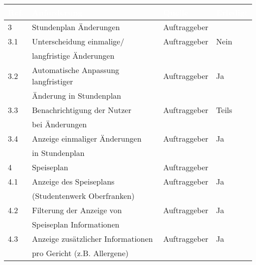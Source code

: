 \begin{table}[H]
\begin{center}
  \begin{tabular}{| l | l | l | l |}
  
\hline
\rowcolor{Gray}
\textcolor{white}{\textbf{Ref.}} & \textcolor{white}{\textbf{Anforderung}} & \textcolor{white}{\textbf{Quelle}} & \textcolor{white}{\textbf{Erledigt}} \\

\hline    
\rowcolor{LGray} 						
3		& Stundenplan Änderungen								& Auftraggeber & \\
\hline
3.1		& Unterscheidung einmalige/ 							& Auftraggeber & Nein\\
		& langfristige Änderungen								&			   &\\
\hline
3.2		& Automatische Anpassung langfristiger 			 		& Auftraggeber & Ja\\
		& Änderung in Stundenplan								& 			   &\\
\hline
3.3		& Benachrichtigung der Nutzer 							& Auftraggeber & Teils\\
		& bei Änderungen										& 			   &\\
\hline
3.4		& Anzeige einmaliger Änderungen 						& Auftraggeber & Ja\\
		& in Stundenplan										&			   &\\
\hline

\hline    
\rowcolor{LGray} 						
4		& Speiseplan											& Auftraggeber & \\
\hline
4.1		& Anzeige des Speiseplans 								& Auftraggeber & Ja\\
		& (Studentenwerk Oberfranken)							&			   &\\
\hline
4.2		& Filterung der Anzeige von 							& Auftraggeber & Ja\\
		& Speiseplan Informationen								&			   &\\			
\hline
4.3		& Anzeige zusätzlicher Informationen 			 		& Auftraggeber & Ja\\
		& pro Gericht (z.B. Allergene)							& 			   &\\
\hline


\end{tabular}
\end{center}
\end{table}
